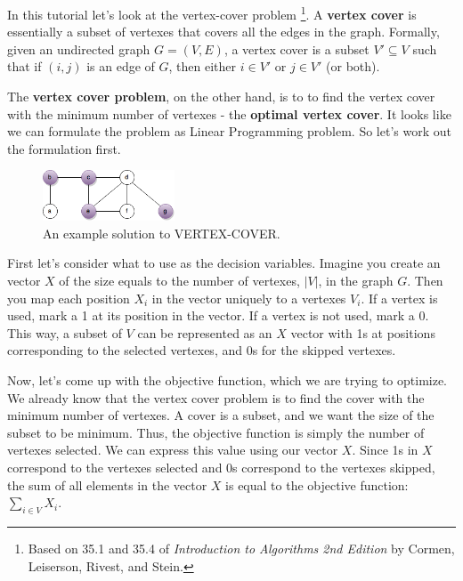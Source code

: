 \documentclass{article}
\begin{document}
In this tutorial let's look at the vertex-cover problem 
\footnote{Based on 35.1 and 35.4 of {\it Introduction to Algorithms
2nd Edition} by Cormen, Leiserson, Rivest, and Stein.}. 
A {\bf vertex cover} is essentially a subset of vertexes that covers all the 
edges in the graph.
Formally, given an undirected graph $G = (V, E)$, a vertex cover is a subset
$V' \subseteq V$ such that if $(i, j)$ is an edge of $G$, then either
$i \in V'$ or $j \in V'$ (or both).

The {\bf vertex cover problem}, on the other hand, is to to find the vertex
cover with the minimum number of vertexes - the {\bf optimal vertex cover}.
It looks like we can formulate the problem as Linear Programming problem.
So let's work out the formulation first.
\begin{figure}[H]
\centering
\includegraphics[width=0.35\textwidth]{vertexcover1.png}
\caption{An example solution to VERTEX-COVER.}
\end{figure}

First let's consider what to use as the decision variables.
Imagine you create an vector $X$ of the size equals to the number of vertexes, 
$|V|$, in the graph $G$. 
Then you map each position $X_i$ in the vector uniquely to a vertexes $V_i$.
If a vertex is used, mark a 1 at its position in the vector. If a vertex
is not used, mark a 0.
This way, a subset of $V$ can be represented as an $X$ vector with 1s at
positions corresponding to the selected vertexes, and 0s for the skipped
vertexes.

Now, let's come up with the objective function, which we are trying to optimize.
We already know that the vertex cover problem is to find the cover with
the minimum number of vertexes. A cover is a subset, and we want the size
of the subset to be minimum. Thus, the objective function is simply the
number of vertexes selected. We can express this value using our vector $X$.
Since 1s in $X$ correspond to the vertexes selected and 0s correspond to the
vertexes skipped, the sum of all elements in the vector $X$ is equal to the
objective function: $\sum_{i \in V} X_i$.
\end{document}
